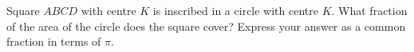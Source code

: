 Square \(ABCD\) with centre \(K\) is inscribed in a circle with centre \(K\). What fraction of the area of the circle does the square cover? Express your answer as a common fraction in terms of \(\pi\).

